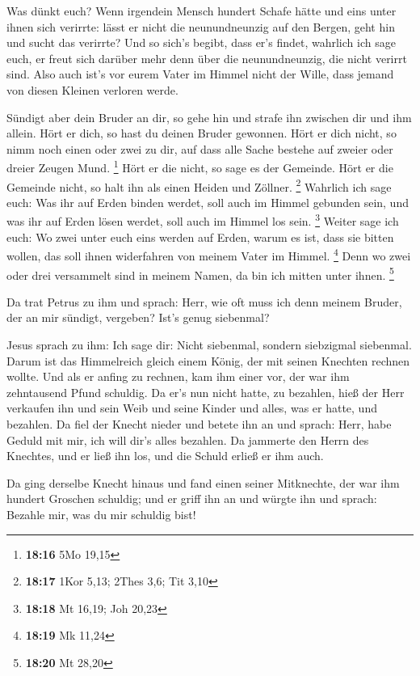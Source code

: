 Was dünkt euch? Wenn irgendein Mensch hundert Schafe hätte
und eins unter ihnen sich verirrte: lässt er nicht die neunundneunzig
auf den Bergen, geht hin und sucht das verirrte?  Und so
sich's begibt, dass er's findet, wahrlich ich sage euch, er freut sich
darüber mehr denn über die neunundneunzig, die nicht verirrt sind.
 Also auch ist's vor eurem Vater im Himmel nicht der Wille,
dass jemand von diesen Kleinen verloren werde.

 Sündigt aber dein Bruder an dir, so gehe hin und strafe
ihn zwischen dir und ihm allein. Hört er dich, so hast du deinen Bruder
gewonnen.  Hört er dich nicht, so nimm noch einen oder zwei
zu dir, auf dass alle Sache bestehe auf zweier oder dreier Zeugen Mund.
\footnote{\textbf{18:16} 5Mo 19,15}  Hört er die nicht, so
sage es der Gemeinde. Hört er die Gemeinde nicht, so halt ihn als einen
Heiden und Zöllner. \footnote{\textbf{18:17} 1Kor 5,13; 2Thes 3,6; Tit
  3,10}  Wahrlich ich sage euch: Was ihr auf Erden binden
werdet, soll auch im Himmel gebunden sein, und was ihr auf Erden lösen
werdet, soll auch im Himmel los sein. \footnote{\textbf{18:18} Mt 16,19;
  Joh 20,23}  Weiter sage ich euch: Wo zwei unter euch eins
werden auf Erden, warum es ist, dass sie bitten wollen, das soll ihnen
widerfahren von meinem Vater im Himmel. \footnote{\textbf{18:19} Mk
  11,24}  Denn wo zwei oder drei versammelt sind in meinem
Namen, da bin ich mitten unter ihnen. \footnote{\textbf{18:20} Mt 28,20}

 Da trat Petrus zu ihm und sprach: Herr, wie oft muss ich
denn meinem Bruder, der an mir sündigt, vergeben? Ist's genug siebenmal?

 Jesus sprach zu ihm: Ich sage dir: Nicht siebenmal,
sondern siebzigmal siebenmal.  Darum ist das Himmelreich
gleich einem König, der mit seinen Knechten rechnen wollte.
 Und als er anfing zu rechnen, kam ihm einer vor, der war
ihm zehntausend Pfund schuldig.  Da er's nun nicht hatte,
zu bezahlen, hieß der Herr verkaufen ihn und sein Weib und seine Kinder
und alles, was er hatte, und bezahlen.  Da fiel der Knecht
nieder und betete ihn an und sprach: Herr, habe Geduld mit mir, ich will
dir's alles bezahlen.  Da jammerte den Herrn des Knechtes,
und er ließ ihn los, und die Schuld erließ er ihm auch.

 Da ging derselbe Knecht hinaus und fand einen seiner
Mitknechte, der war ihm hundert Groschen schuldig; und er griff ihn an
und würgte ihn und sprach: Bezahle mir, was du mir schuldig bist!

